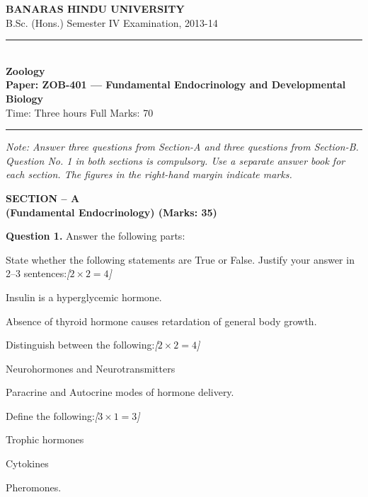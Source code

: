 \documentclass[11pt,a4paper]{article}
\newcommand{\pts}[1]{\hfill   \textit{[#1]}}
\begin{document}
\begin{center}
  {\large\bfseries BANARAS HINDU UNIVERSITY}\\[2pt]
  {\normalsize B.Sc. (Hons.) Semester IV Examination, 2013-14}\\[6pt]
  \rule{0.8\linewidth}{0.5pt}\\[6pt]
  {\large\bfseries Zoology}\\[4pt]
  {\large\bfseries Paper: ZOB-401 --- Fundamental Endocrinology and Developmental Biology}\\[4pt]
  {\normalsize Time: Three hours \hfill Full Marks: 70}
\end{center}

\rule{\linewidth}{0.4pt}

\smallskip



\noindent   \textit{Note: Answer three questions from Section-A and three questions from Section-B. Question No. 1 in both sections is compulsory. Use a separate answer book for each section. The figures in the right-hand margin indicate marks.}

\bigskip

\begin{center}
   \textbf{SECTION -- A} \\
   \textbf{(Fundamental Endocrinology) (Marks: 35)}
\end{center}

\medskip


\noindent   \textbf{Question 1.} Answer the following parts:

\begin{parts}
  \item State whether the following statements are True or False. Justify your answer in 2--3 sentences:\pts{$2  \times 2 = 4$}
  
\begin{parts}
    \item Insulin is a hyperglycemic hormone.
    \item Absence of thyroid hormone causes retardation of general body growth.
  \end{parts}
  
  \item Distinguish between the following:\pts{$2  \times 2 = 4$}
  
\begin{parts}
    \item Neurohormones and Neurotransmitters
    \item Paracrine and Autocrine modes of hormone delivery.
  \end{parts}

  \item Define the following:\pts{$3  \times 1 = 3$}
  
\begin{parts}
    \item Trophic hormones
    \item Cytokines
    \item Pheromones.
  \end{parts}
\end{parts}
\end{document}
